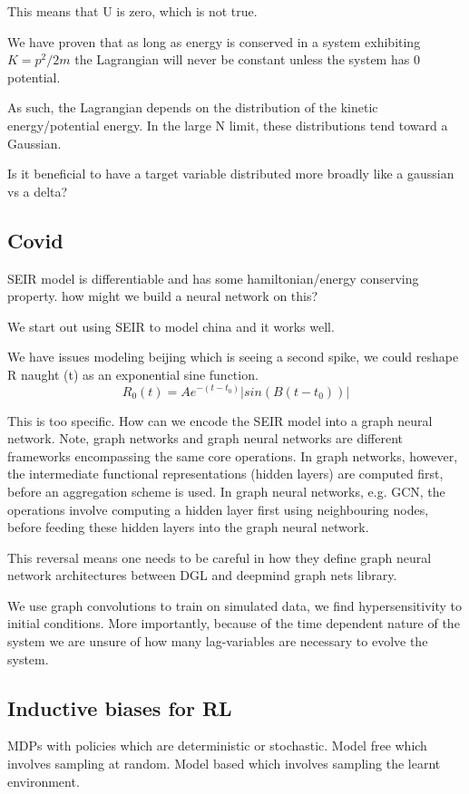\documentclass{article}
\begin{document}
This means that U is zero, which is not true.

We have proven that as long as energy is conserved in a system exhibiting $K = p^2/2m$ the Lagrangian will never be constant unless the system has 0 potential. 

As such, the Lagrangian depends on the distribution of the kinetic energy/potential energy. In the large N limit, these distributions tend toward a Gaussian.

Is it beneficial to have a target variable distributed more broadly like a gaussian vs a delta?


\subsection{Covid}


SEIR model is differentiable and has some hamiltonian/energy conserving property. how might we build a neural network on this?

We start out using SEIR to model china and it works well.

We have issues modeling beijing which is seeing a second spike, we could reshape R naught (t) as an exponential sine function.
$$ R_0(t) = Ae^{-(t-t_0)}|sin(B(t-t_0))| $$

This is too specific. How can we encode the SEIR model into a graph neural network. Note, graph networks and graph neural networks are different frameworks encompassing the same core operations. In graph networks, however, the intermediate functional representations (hidden layers) are computed first, before an aggregation scheme is used. In graph neural networks, e.g. GCN, the operations involve computing a hidden layer first using neighbouring nodes, before feeding these hidden layers into the graph neural network.

This reversal means one needs to be careful in how they define graph neural network architectures between DGL and deepmind graph nets library.

We use graph convolutions to train on simulated data, we find hypersensitivity to initial conditions. More importantly, because of the time dependent nature of the system we are unsure of how many lag-variables are necessary to evolve the system.

\subsection{Inductive  biases for RL}

MDPs with policies which are deterministic or stochastic. Model free which involves sampling at random. Model based which involves sampling the learnt environment.
\end{document}
